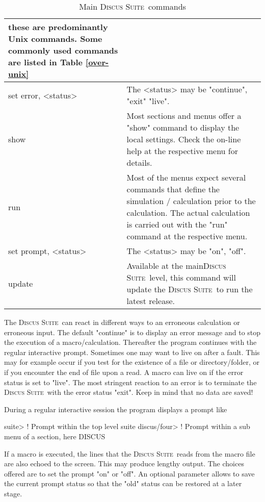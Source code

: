 \documentclass[11pt]{report}
\newcommand{\Suite}{\textsc{Discus Suite\ }}
\begin{document}
{\begin{table}[!tbh]
\begin{tabularx}{\textwidth}{|p{50mm}|X|}
          these are predominantly Unix commands. Some 
          commonly used commands are listed in Table
          \ref{over-unix}\\
  \hline
   set error, <status> & The <status> may be "continue", 
          "exit" "live".\\
  \hline
   show  & Most sections and menus offer a "show" command
           to display the local settings. Check the on-line
           help at the respective menu for details.\\
  \hline
   run   & Most of the menus expect several commands that
           define the simulation / calculation prior to the
           calculation. The actual 
           calculation is carried out with the "run" command
           at the respective menu.\\
  \hline
   set prompt, <status> & The <status> may be "on", "off".\\
  \hline
   update & Available at the main\Suite level, this command 
            will update the \Suite to run the latest release.\\
  \hline
\end{tabularx}
\caption{\label{over-cmds}Main \Suite commands}
\end{table}

The \Suite can react in different ways to an erroneous calculation or 
erroneous input. The default "continue" is to display an error message 
and to stop the execution of a macro/calculation. Thereafter the program 
continues with the regular interactive prompt. Sometimes one may
want to live on after a fault. This may for example occur if you test
for the existence of a file or directory/folder, or if you encounter 
the end of file upon a read. A macro can live on if the error status is
set to "live". The most stringent reaction to an error is to terminate
the  \Suite with the error status "exit". Keep in mind that no data are
saved!

During a regular interactive session the program displays a prompt like
\begin{MacVerbatim}
suite>         ! Prompt within the top level suite
discus/four>   ! Prompt within a sub menu of a section, here DISCUS
\end{MacVerbatim}
If a macro is executed, the lines that the \Suite reads from the macro
file are also echoed to the screen. This may produce lengthy output.
The choices offered are to set the prompt "on" or "off". An optional
parameter allows to save the current prompt status so that the "old" 
status can be restored at a later stage.


}
\end{document}
